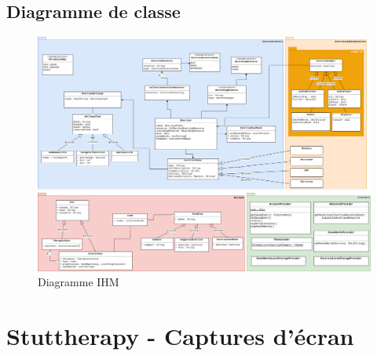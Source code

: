\begin{appendices}
\begin{landscape}
\chapter{Diagramme de classe}
\label{appendix:class}
\vspace{-35pt}
\begin{figure}[H]
  \includegraphics[width=0.9\linewidth]{content/imgs/app_class_diagram.png}
  \caption*{Diagramme IHM}
\end{figure}
\end{landscape}

\chapter{Stuttherapy - Captures d'écran}




\end{appendices}
